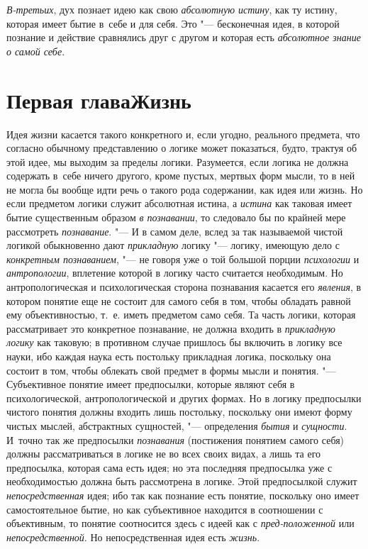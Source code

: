 {\em В-третьих}, дух
познает идею как свою {\em абсолютную
истину}, как ту истину, которая имеет бытие в~себе и для
себя. Это "--- бесконечная идея, в которой познание и действие
сравнялись друг с другом и которая есть
{\em абсолютное знание о самой себе}.

\chapter[Первая глава Жизнь]{Первая глава\newline Жизнь}
Идея жизни касается такого конкретного и, если угодно,
реального предмета, что согласно обычному представлению о логике может
показаться, будто, трактуя об этой идее, мы выходим за пределы логики.
Разумеется, если логика не должна содержать в~себе ничего другого, кроме
пустых, мертвых форм мысли, то в ней не могла бы вообще идти речь о такого
рода содержании, как идея или жизнь. Но если предметом логики служит
абсолютная истина, а {\em истина}
как таковая имеет бытие существенным образом
{\em в познавании}, то
следовало бы по крайней мере рассмотреть {\em познавание}. "--- И в
самом деле, вслед за так называемой чистой логикой обыкновенно дают
{\em прикладную} логику "--- логику, имеющую дело с
{\em конкретным познаванием}, "--- не говоря уже о той большой порции
{\em психологии} и {\em антропологии},
вплетение которой в логику часто считается необходимым. Но
антропологическая и психологическая сторона познавания касается его
{\em явления}, в котором
понятие еще не состоит для самого себя в том, чтобы обладать равной ему
объективностью, т.~е. иметь предметом само себя. Та часть логики, которая
рассматривает это конкретное познавание, не должна входить в
{\em прикладную логику}
как таковую; в противном случае пришлось бы включить в логику
все науки, ибо каждая наука есть постольку прикладная логика, поскольку она
состоит в том, чтобы облекать свой предмет в формы мысли и понятия. "---
Субъективное понятие имеет предпосылки, которые являют себя в
психологической, антропологической и других формах. Но в логику предпосылки
чистого понятия должны входить лишь постольку, поскольку они имеют форму
чистых мыслей, абстрактных сущностей, "--- определения
{\em бытия} и {\em сущности}. И~точно
так же предпосылки {\em познавания}
(постижения понятием самого себя) должны
рассматриваться в логике не во всех своих видах, а лишь та
его предпосылка, которая сама есть идея; но эта последняя предпосылка уже с
необходимостью должна быть рассмотрена в логике. Этой предпосылкой служит
{\em непосредственная}
идея; ибо так как познание есть понятие, поскольку оно имеет
самостоятельное бытие, но как субъективное находится в соотношении с
объективным, то понятие соотносится здесь с идеей как с
{\em пред-положенной} или
{\em непосредственной}.
Но непосредственная идея есть
{\em жизнь}.

